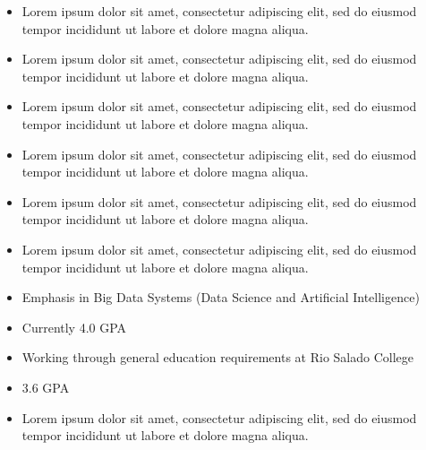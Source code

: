 \documentclass[10pt,a4paper,ragged2e,landscape]{altacv}
\begin{document}

\marginpar{}
\makecvheader



\begin{itemize}
\item Lorem ipsum dolor sit amet, consectetur adipiscing elit, sed do eiusmod tempor incididunt ut labore et dolore magna aliqua. 
\item Lorem ipsum dolor sit amet, consectetur adipiscing elit, sed do eiusmod tempor incididunt ut labore et dolore magna aliqua. 
\end{itemize}
\divider

\begin{itemize}
	\item Lorem ipsum dolor sit amet, consectetur adipiscing elit, sed do eiusmod tempor incididunt ut labore et dolore magna aliqua. 
	\item Lorem ipsum dolor sit amet, consectetur adipiscing elit, sed do eiusmod tempor incididunt ut labore et dolore magna aliqua. 
\end{itemize}
\divider

\begin{itemize}
\item Lorem ipsum dolor sit amet, consectetur adipiscing elit, sed do eiusmod tempor incididunt ut labore et dolore magna aliqua. 
\item Lorem ipsum dolor sit amet, consectetur adipiscing elit, sed do eiusmod tempor incididunt ut labore et dolore magna aliqua. 
\end{itemize}

\begin{itemize}
\item Emphasis in Big Data Systems (Data Science and Artificial Intelligence)
\item Currently 4.0 GPA  
\item Working through general education requirements at Rio Salado College
\end{itemize}
\divider

\begin{itemize}
\item  3.6 GPA
\item  Lorem ipsum dolor sit amet, consectetur adipiscing elit, sed do eiusmod tempor incididunt ut labore et dolore magna aliqua. 
\end{itemize}

\clearpage
\end{document}
